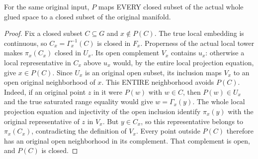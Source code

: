 \begin{lemma}
\label{hir:original-terminal-glued-whole-closed-projection}
\leanok
{}
For the same original input, $P$ maps EVERY closed subset of the actual
whole glued space to a closed subset of the original manifold.
\end{lemma}
\begin{proof}
Fix a closed subset $C\subseteq G$ and $x\notin P(C)$. The true local
embedding is continuous, so $C_x=\Gamma_x^{-1}(C)$ is closed in $F_x$.
Properness of the actual local tower makes $\pi_x(C_x)$ closed in $U_x$.
Its open complement $V_x$ contains $u_x$: otherwise a local representative
in $C_x$ above $u_x$ would, by the entire local projection equation, give
$x\in P(C)$. Since $U_x$ is an original open subset, its inclusion maps
$V_x$ to an open original neighborhood of $x$.
This ENTIRE neighborhood avoids $P(C)$. Indeed, if an original point
$z$ in it were $P(w)$ with $w\in C$, then $P(w)\in U_x$ and the true
saturated range equality would give $w=\Gamma_x(y)$. The whole local
projection equation and injectivity of the open inclusion identify
$\pi_x(y)$ with the original representative of $z$ in $V_x$. But $y\in C_x$,
so this representative belongs to $\pi_x(C_x)$, contradicting the definition
of $V_x$. Every point outside $P(C)$ therefore has an original open
neighborhood in its complement. That complement is open, and $P(C)$ is closed.
\end{proof}

